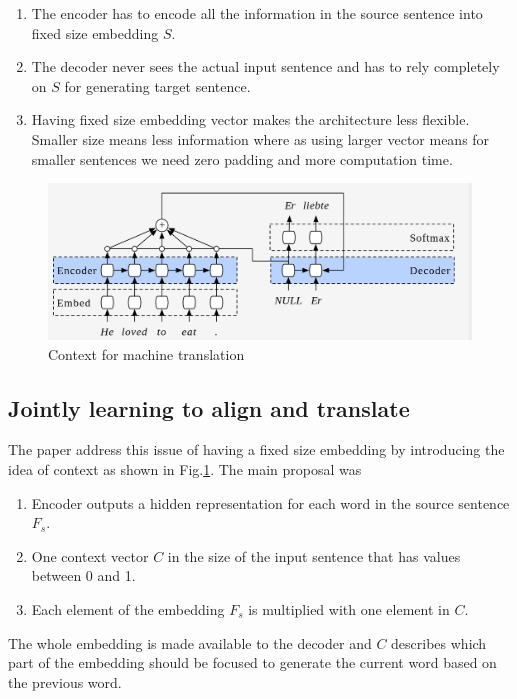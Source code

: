 \documentclass[a4paper]{article}
\begin{document}
\begin{enumerate}
  \item The  encoder  has to  encode all the  information in the source sentence
        into fixed size embedding $S$.
  \item The decoder  never  sees  the  actual  input  sentence  and  has to rely
        completely on $S$ for generating target sentence.
  \item Having fixed size embedding vector makes the architecture less flexible.
        Smaller size means less  information where  as using larger vector means
        for smaller sentences we need zero padding and more computation time.
\end{enumerate}


\begin{figure}
  \includegraphics[width=.99\linewidth]{img/context.png}
  \caption{Context for machine translation}
  \label{fig:context}
\end{figure}


\subsection{Jointly learning to align and translate} \label{sec:JT}
The paper  \cite{bahdanau2014neural}  address this  issue of having a fixed size
embedding  by  introducing  the  idea of  context  as shown in Fig.\ref{fig:context}.  The  main
proposal was


\begin{enumerate}
  \item Encoder  outputs a  hidden  representation  for  each word in the source
        sentence $F_s$.
  \item One context vector $C$ in the size of the input sentence that has values
        between 0 and 1.
  \item Each element of the embedding  $F_s$  is multiplied with one  element in
        $C$.
\end{enumerate}


The whole embedding  is made available  to  the decoder and $C$ describes  which
part of the embedding should be focused to generate  the current  word based  on
the previous word.
\end{document}
